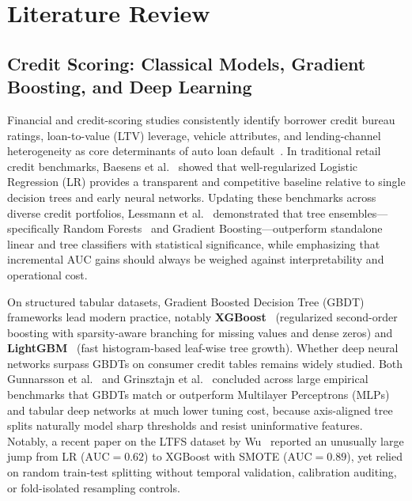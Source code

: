 \section{Literature Review}
\label{sec:literature}

\subsection{Credit Scoring: Classical Models, Gradient Boosting, and Deep Learning}
Financial and credit-scoring studies consistently identify borrower credit bureau ratings, loan-to-value (LTV) leverage, vehicle attributes, and lending-channel heterogeneity as core determinants of auto loan default~\cite{agarwal2008}. In traditional retail credit benchmarks, Baesens et al.~\cite{baesens2003} showed that well-regularized Logistic Regression (LR) provides a transparent and competitive baseline relative to single decision trees and early neural networks. Updating these benchmarks across diverse credit portfolios, Lessmann et al.~\cite{lessmann2015} demonstrated that tree ensembles---specifically Random Forests~\cite{breiman2001} and Gradient Boosting---outperform standalone linear and tree classifiers with statistical significance, while emphasizing that incremental AUC gains should always be weighed against interpretability and operational cost.

On structured tabular datasets, Gradient Boosted Decision Tree (GBDT) frameworks lead modern practice, notably \textbf{XGBoost}~\cite{chen2016} (regularized second-order boosting with sparsity-aware branching for missing values and dense zeros) and \textbf{LightGBM}~\cite{ke2017} (fast histogram-based leaf-wise tree growth). Whether deep neural networks surpass GBDTs on consumer credit tables remains widely studied. Both Gunnarsson et al.~\cite{gunnarsson2021} and Grinsztajn et al.~\cite{grinsztajn2022} concluded across large empirical benchmarks that GBDTs match or outperform Multilayer Perceptrons (MLPs) and tabular deep networks at much lower tuning cost, because axis-aligned tree splits naturally model sharp thresholds and resist uninformative features. Notably, a recent paper on the LTFS dataset by Wu~\cite{wu2025} reported an unusually large jump from LR ($\text{AUC}=0.62$) to XGBoost with SMOTE ($\text{AUC}=0.89$), yet relied on random train-test splitting without temporal validation, calibration auditing, or fold-isolated resampling controls.

